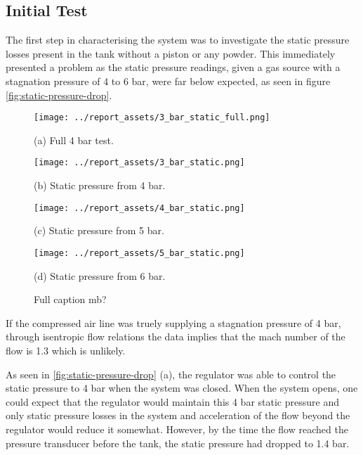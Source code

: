\subsection{Initial Test}
The first step in characterising the system was to investigate the static pressure losses present in the tank without a piston or any powder. This immediately presented a problem as the static pressure readings, given a gas source with a stagnation pressure of 4 to 6 bar, were far below expected, as seen in figure \autoref{fig:static-pressure-drop}. 
\begin{figure}[htbp]
    \centering

    \begin{minipage}{0.45\textwidth}
        \centering
        \texttt{[image: ../report\_assets/3\_bar\_static\_full.png]}
        \caption*{(a) Full 4 bar test.}
    \end{minipage}
    \hfill
    \begin{minipage}{0.45\textwidth}
        \centering
        \texttt{[image: ../report\_assets/3\_bar\_static.png]}
        \caption*{(b) Static pressure from 4 bar.}
    \end{minipage}
    \begin{minipage}{0.45\textwidth}
        \centering
        \texttt{[image: ../report\_assets/4\_bar\_static.png]}
        \caption*{(c) Static pressure from 5 bar.}
    \end{minipage}
    \hfill
    \begin{minipage}{0.45\textwidth}
        \centering
        \texttt{[image: ../report\_assets/5\_bar\_static.png]}
        \caption*{(d) Static pressure from 6 bar.}
    \end{minipage}

    \caption{Full caption mb?}\label{fig:static-pressure-drop}
\end{figure}
If the compressed air line was truely supplying a stagnation pressure of 4 bar, through isentropic flow relations the data implies that the mach number of the flow is 1.3 which is unlikely.

As seen in \autoref{fig:static-pressure-drop} (a), the regulator was able to control the static pressure to 4 bar when the system was closed. When the system opens, one could expect that the regulator would maintain this 4 bar static pressure and only static pressure losses in the system and acceleration of the flow beyond the regulator would reduce it somewhat. However, by the time the flow reached the pressure transducer before the tank, the static pressure had dropped to 1.4 bar. 

